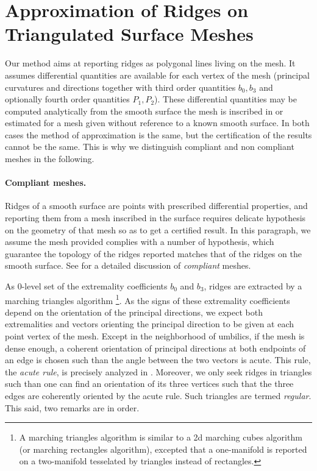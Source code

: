 \section{Approximation of Ridges on Triangulated Surface Meshes}
\label{ridge-mesh}

Our method aims at reporting ridges as polygonal lines living on the
mesh. It assumes differential quantities are available for each vertex
of the mesh (principal curvatures and directions together with third
order quantities $b_0, b_3$ and optionally fourth order quantities
$P_1, P_2$). These differential quantities may be computed
analytically from the smooth surface the mesh is inscribed in or
estimated for a mesh given without reference to a known smooth
surface.  In both cases the method of approximation is the same, but
the certification of the results cannot be the same. This is why we
distinguish compliant and non compliant meshes in the following.


\paragraph{Compliant meshes.}
Ridges of a smooth surface are points with prescribed differential
properties, and reporting them from a mesh inscribed in the surface
requires delicate hypothesis on the geometry of that mesh so as to get
a certified result. In this paragraph, we assume the mesh provided
complies with a number of hypothesis, which guarantee the topology of
the ridges reported matches that of the ridges on the smooth
surface. See \cite{cgal:cp-tdare-05} for a detailed discussion of {\em
  compliant} meshes.  \medskip

As 0-level set of the extremality coefficients $b_0$ and $b_3$, ridges
are extracted by a marching triangles algorithm \footnote{A marching
  triangles algorithm is similar to a 2d marching cubes algorithm (or
  marching rectangles algorithm), excepted that a one-manifold is
  reported on a two-manifold tesselated by triangles instead of
  rectangles.}.
As the signs of these extremality coefficients depend on the
orientation of the principal directions, we expect both extremalities
and vectors orienting the principal direction to be given at each
point vertex of the mesh. Except in the neighborhood of umbilics, if
the mesh is dense enough, a coherent orientation of principal
directions at both endpoints of an edge is chosen such than the angle
between the two vectors is acute. This rule, the {\em acute rule}, is
precisely analyzed in \cite{cgal:cp-tdare-05}.
Moreover, we only seek ridges in triangles such than one can find an
orientation of its three vertices such that the three edges are
coherently oriented by the acute rule. Such triangles are termed
{\em regular}. This said, two remarks are in order.

